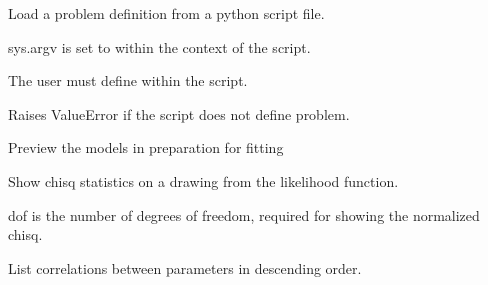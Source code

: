 \documentclass[letterpaper,10pt,english]{sphinxmanual}
\begin{document}

\begin{fulllineitems}
\label{api/fitproblem:refl1d.fitproblem.load_problem}
Load a problem definition from a python script file.

sys.argv is set to  within the context of the script.

The user must define  within the script.

Raises ValueError if the script does not define problem.

\end{fulllineitems}


\begin{fulllineitems}
\label{api/fitproblem:refl1d.fitproblem.mesh}
\end{fulllineitems}


\begin{fulllineitems}
\label{api/fitproblem:refl1d.fitproblem.preview}
Preview the models in preparation for fitting

\end{fulllineitems}


\begin{fulllineitems}
\label{api/fitproblem:refl1d.fitproblem.show_chisq}
Show chisq statistics on a drawing from the likelihood function.

dof is the number of degrees of freedom, required for showing the
normalized chisq.

\end{fulllineitems}


\begin{fulllineitems}
\label{api/fitproblem:refl1d.fitproblem.show_correlations}
List correlations between parameters in descending order.

\end{fulllineitems}
\end{document}
